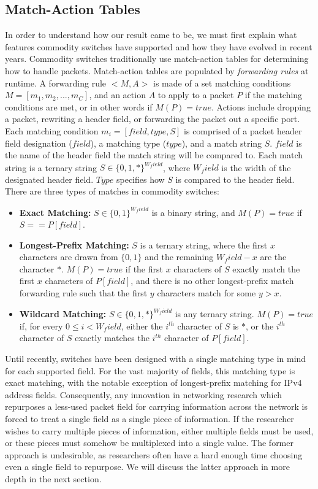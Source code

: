 \subsection{Match-Action Tables}
In order to understand how our result came to be, we must first explain what features commodity switches have supported and how they have evolved in recent years. Commodity switches traditionally use match-action tables for determining how to handle packets. Match-action tables are populated by \textit{forwarding rules} at runtime. A forwarding rule $<M, A>$ is made of a set matching conditions $M = [m_1, m_2, ..., m_C]$, and an action $A$ to apply to a packet $P$ if the matching conditions are met, or in other words if $M(P) = true$. Actions include dropping a packet, rewriting a header field, or forwarding the packet out a specific port. Each matching condition $m_i = [field, type, S]$ is comprised of a packet header field designation ($field$), a matching type ($type$), and a match string $S$. $field$ is the name of the header field the match string will be compared to. Each match string is a ternary string $S \in \{0,1,*\}^{W_field}$, where $W_field$ is the width of the designated header field. $Type$ specifies how $S$ is compared to the header field. There are three types of matches in commodity switches:
  \begin{itemize}
  \item{\textbf{Exact Matching:} $S \in \{0,1\}^{W_field}$ is a binary string, and $M(P) = true$ if $S == P[field]$.}\\
  \item{\textbf{Longest-Prefix Matching:} $S$ is a ternary string, where the first $x$ characters are drawn from $\{0,1\}$ and the remaining $W_field - x$ are the character $*$. $M(P) = true$ if the first $x$ characters of $S$ exactly match the first $x$ characters of $P[field]$, and there is no other longest-prefix match forwarding rule such that the first $y$ characters match for some $y > x$.}\\
  \item{\textbf{Wildcard Matching:} $S \in \{0,1,*\}^{W_field}$ is any ternary string. $M(P) = true$ if, for every $0 \le i < W_field$, either the $i^{th}$ character of $S$ is $*$, or the $i^{th}$ character of $S$ exactly matches the $i^{th}$ character of $P[field]$.}
  \end{itemize}
  
  Until recently, switches have been designed with a single matching type in mind for each supported field. For the vast majority of fields, this matching type is exact matching, with the notable exception of longest-prefix matching for IPv4 address fields. Consequently, any innovation in networking research which repurposes a less-used packet field for carrying information across the network is forced to treat a single field as a single piece of information. If the researcher wishes to carry multiple pieces of information, either multiple fields must be used, or these pieces must somehow be multiplexed into a single value. The former approach is undesirable, as researchers often have a hard enough time choosing even a single field to repurpose. We will discuss the latter approach in more depth in the next section. 
  
